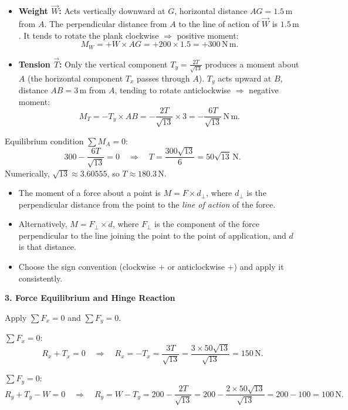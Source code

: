 \documentclass[11pt]{article}
\begin{document}
\begin{itemize}
    \item \textbf{Weight $\vec{W}$:} Acts vertically downward at $G$, horizontal distance $AG = 1.5\,\mathrm{m}$ from $A$. The perpendicular distance from $A$ to the line of action of $\vec{W}$ is $1.5\,\mathrm{m}$. It tends to rotate the plank clockwise $\Rightarrow$ positive moment:
    \[
    M_W = +W \times AG = +200 \times 1.5 = +300\,\mathrm{N\,m}.
    \]
    \item \textbf{Tension $\vec{T}$:} Only the vertical component $T_y = \frac{2T}{\sqrt{13}}$ produces a moment about $A$ (the horizontal component $T_x$ passes through $A$). $T_y$ acts upward at $B$, distance $AB = 3\,\mathrm{m}$ from $A$, tending to rotate anticlockwise $\Rightarrow$ negative moment:
    \[
    M_T = -T_y \times AB = -\frac{2T}{\sqrt{13}} \times 3 = -\frac{6T}{\sqrt{13}}\,\mathrm{N\,m}.
    \]
\end{itemize}
Equilibrium condition $\sum M_A = 0$:
\[
300 - \frac{6T}{\sqrt{13}} = 0 \quad\Rightarrow\quad T = \frac{300\sqrt{13}}{6} = 50\sqrt{13}\,\mathrm{N}.
\]
Numerically, $\sqrt{13}\approx 3.60555$, so $T \approx 180.3\,\mathrm{N}$.

\begin{attention}
\begin{itemize}
\item The moment of a force about a point is $M = F \times d_\perp$, where $d_\perp$ is the perpendicular distance from the point to the \emph{line of action} of the force.
\item Alternatively, $M = F_\perp \times d$, where $F_\perp$ is the component of the force perpendicular to the line joining the point to the point of application, and $d$ is that distance.
\item Choose the sign convention (clockwise $+$ or anticlockwise $+$) and apply it consistently.
\end{itemize}
\end{attention}

\textbf{3. Force Equilibrium and Hinge Reaction}\par
Apply $\sum F_x = 0$ and $\sum F_y = 0$.

$\sum F_x = 0$:
\[
R_x + T_x = 0 \quad\Rightarrow\quad R_x = -T_x = \frac{3T}{\sqrt{13}} = \frac{3 \times 50\sqrt{13}}{\sqrt{13}} = 150\,\mathrm{N}.
\]

$\sum F_y = 0$:
\[
R_y + T_y - W = 0 \quad\Rightarrow\quad R_y = W - T_y = 200 - \frac{2T}{\sqrt{13}} = 200 - \frac{2 \times 50\sqrt{13}}{\sqrt{13}} = 200 - 100 = 100\,\mathrm{N}.
\]
\end{document}
